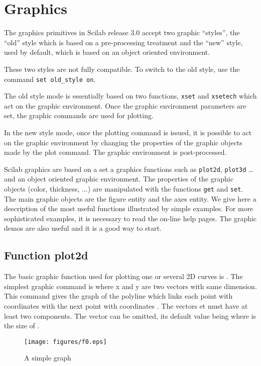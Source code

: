 \chapter{Graphics}\label{Graphics}
The graphics primitives in Scilab release 3.0 accept two graphic ``styles'',
the ``old'' style which is based on a pre-processing treatment 
and the ``new'' style, used by default, which is based on an object 
oriented environment.

These two styles are not fully compatible. To switch to the old style,
use the command \verb!set old_style on!.

The old style mode is essentially based on two functions, 
{\tt xset} and {\tt xsetech} which act on the graphic environment.
Once the graphic environment parameters are set, the graphic commands
are used for plotting.

In the new style mode, once the plotting command is issued, it is 
possible to act on the graphic environment by changing the
properties of the graphic objects made by the plot command.
The graphic environment is post-processed.



Scilab graphics are based on a set a graphics functions such as {\tt plot2d},
{\tt plot3d} \ldots and an object oriented graphic environment.
The properties of the graphic objects (color, thickness, ...) are manipulated
with the functions {\tt get} and {\tt set}. The main graphic objects
are the figure entity and the axes entity. 
We give here a description of the most useful functions illustrated by
simple examples. For more sophisticated examples, it is necessary to read
the on-line help pages. The graphic demos are also useful and it is
a good way to start.

\section{Function plot2d}
The basic graphic function  used
for plotting one or several 2D curves is .
The simplest graphic command is  where 
x and y are two vectors with same dimension.
This command gives the graph of the polyline which links each
point with  coordinates  with the next point
with coordinates . The vectors
 et  must have at least two components. 
The vector  can be omitted, its default value being 
 where  is the size of . 
\begin{figure}
\begin{center}
\texttt{[image: figures/f0.eps]}
\end{center}
\caption{A simple graph}
\label{f0}
\end{figure}


